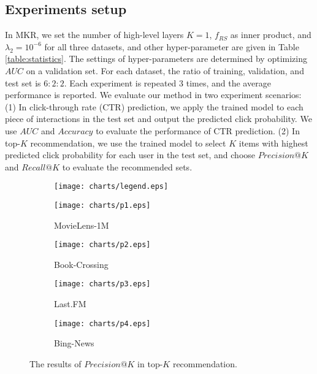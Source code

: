 \documentclass[sigconf]{acmart}
\begin{document}
		
	
	\subsection{Experiments setup}
		In MKR, we set the number of high-level layers $K = 1$, $f_{RS}$ as inner product, and $\lambda_2 = 10^{-6}$ for all three datasets, and other hyper-parameter are given in Table \ref{table:statistics}.
		The settings of hyper-parameters are determined by optimizing $AUC$ on a validation set.
		For each dataset, the ratio of training, validation, and test set is $6 : 2 : 2$.
		Each experiment is repeated $3$ times, and the average performance is reported.
		We evaluate our method in two experiment scenarios:
		(1) In click-through rate (CTR) prediction, we apply the trained model to each piece of interactions in the test set and output the predicted click probability.
		We use $AUC$ and $Accuracy$ to evaluate the performance of CTR prediction.
		(2) In top-$K$ recommendation, we use the trained model to select $K$ items with highest predicted click probability for each user in the test set, and choose $Precision@K$ and $Recall@K$ to evaluate the recommended sets.
	
		\begin{figure*}[t]
			\centering
			\begin{subfigure}[b]{0.95\textwidth}
                \texttt{[image: charts/legend.eps]}
                \vspace{-0.2in}
            \end{subfigure}
            \hfill
            \begin{subfigure}[b]{0.24\textwidth}
                \texttt{[image: charts/p1.eps]}
                \caption{MovieLens-1M}
            \end{subfigure}
            \hfill
            \begin{subfigure}[b]{0.24\textwidth}
                \texttt{[image: charts/p2.eps]}
                \caption{Book-Crossing}
            \end{subfigure}
            \hfill
            \begin{subfigure}[b]{0.24\textwidth}
                \texttt{[image: charts/p3.eps]}
                \caption{Last.FM}
            \end{subfigure}
            \hfill
            \begin{subfigure}[b]{0.24\textwidth}
                \texttt{[image: charts/p4.eps]}
                \caption{Bing-News}
            \end{subfigure}
            \caption{The results of $Precision@K$ in top-$K$ recommendation.}
            \label{fig:precision}
        \end{figure*}
        
\end{document}
